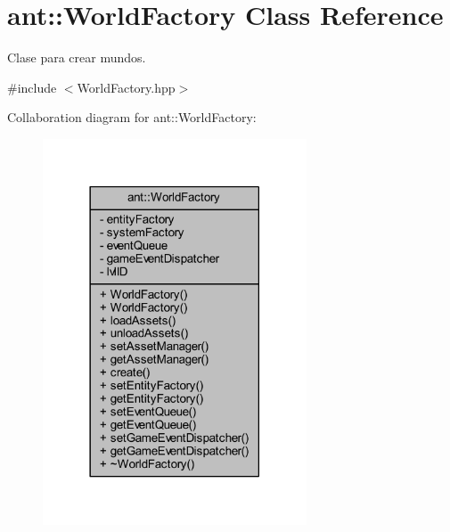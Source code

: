 \hypertarget{classant_1_1_world_factory}{\section{ant\+:\+:World\+Factory Class Reference}
\label{classant_1_1_world_factory}
}


Clase para crear mundos.  




{\ttfamily \#include $<$World\+Factory.\+hpp$>$}



Collaboration diagram for ant\+:\+:World\+Factory\+:
\nopagebreak
\begin{figure}[H]
\begin{center}
\leavevmode
\includegraphics[width=222pt]{d2/d35/classant_1_1_world_factory__coll__graph}
\end{center}
\end{figure}
